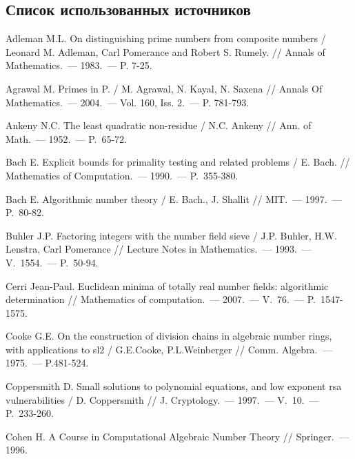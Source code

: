 \renewcommand{\bibname}{БИБЛИОГРАФИЧЕСКИЙ СПИСОК}

\begin{thebibliography}{99}
\section*{Список использованных источников}
\vspace{-12pt}

    Adleman M.L. On distinguishing prime numbers from composite numbers / Leonard M. Adleman, Carl Pomerance and Robert S. Rumely. // Annals of Mathematics.~--- 1983.~--- P. 7-25.
    
    Agrawal M. Primes in P. / M. Agrawal, N. Kayal, N. Saxena // Annals Of Mathematics.~--- 2004.~--- Vol. 160, Iss. 2.~--- P. 781-793.
    
    Ankeny N.C. The least quadratic non-residue / N.C. Ankeny // Ann. of Math.~--- 1952.~--- P.~65-72.

    Bach E. Explicit bounds for primality testing and related problems / E. Bach. // Mathematics of Computation.~--- 1990.~--- P.~355-380.
    
    Bach E. Algorithmic number theory / E. Bach., J. Shallit // MIT.~--- 1997.~--- P.~80-82.
    
    Buhler J.P. Factoring integers with the number field sieve / J.P. Buhler, H.W. Lenstra, Carl Pomerance // Lecture Notes in Mathematics.~--- 1993.~--- V.~1554.~--- P.~50-94.

    Cerri Jean-Paul. Euclidean minima of totally real number fields: algorithmic determination // Mathematics of computation.~--- 2007.~--- V.~76.~--- {P.}~1547-1575.

    Cooke G.E. On the construction of division chains in algebraic number rings, with applications to sl2 / G.E.Cooke, P.L.Weinberger // Comm. Algebra.~--- 1975.~--- P.481-524.

    Coppersmith D. Small solutions to polynomial equations, and low exponent rsa vulnerabilities / D. Coppersmith // J. Cryptology.~--- 1997.~--- V.~10.~--- P.~233-260.

    Cohen H. A Course in Computational Algebraic Number Theory // Springer.~--- 1996.
    

\end{thebibliography}
